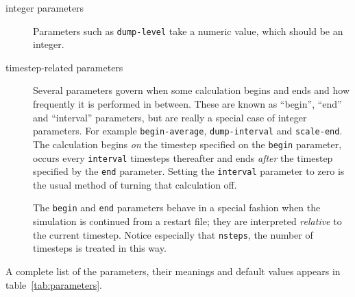 \begin{description}
\item[integer parameters] Parameters such as \verb'dump-level' take a
numeric value, which should be an integer.

\item[timestep-related parameters] Several parameters govern when some
calculation begins and ends and how frequently it is performed in
between. These are known as ``begin'', ``end'' and ``interval''
parameters, but are really a special case of integer parameters.  For
example \verb'begin-average', \verb'dump-interval' and
\verb'scale-end'.  The calculation begins {\em on} the timestep
specified on the \verb'begin' parameter, occurs every \verb'interval'
timesteps thereafter and ends {\em after} the timestep specified by
the \verb'end' parameter.  Setting the \verb'interval' parameter to
zero is the usual method of turning that calculation off.

The \verb'begin' and \verb'end' parameters behave in a special fashion
when the simulation is continued from a restart file; they are
interpreted {\em relative} to the current timestep.  Notice especially
that \verb'nsteps', the number of timesteps is treated in this way.

\end{description}

A complete list of the parameters,
their meanings and default values appears in
table~\ref{tab:parameters}. 

